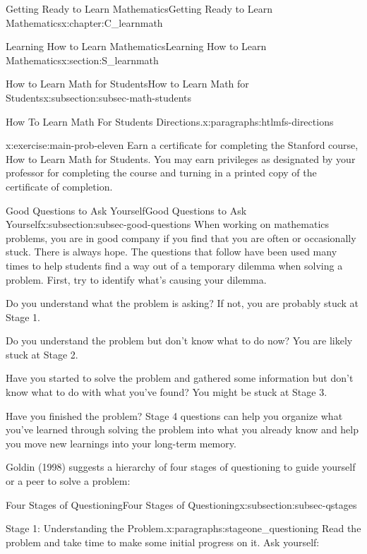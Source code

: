 \documentclass[oneside,10pt,]{book}
\numberwithin{equation}{chapter}
\begin{document}
\begin{chapterptx}{Getting Ready to Learn Mathematics}{}{Getting Ready to Learn Mathematics}{}{}{x:chapter:C_learnmath}
\begin{sectionptx}{Learning How to Learn Mathematics}{}{Learning How to Learn Mathematics}{}{}{x:section:S_learnmath}
\begin{subsectionptx}{How to Learn Math for Students}{}{How to Learn Math for Students}{}{}{x:subsection:subsec-math-students}
\begin{paragraphs}{How To Learn Math For Students Directions.}{x:paragraphs:htlmfs-directions}
\begin{inlineexercise}{}{x:exercise:main-prob-eleven}
Earn a certificate for completing the Stanford course, How to Learn Math for Students. You may earn privileges as designated by your professor for completing the course and turning in a printed copy of the certificate of completion.%
\end{inlineexercise}%
\end{paragraphs}%
\end{subsectionptx}
%
%
\typeout{************************************************}
\typeout{************************************************}
%
\begin{subsectionptx}{Good Questions to Ask Yourself}{}{Good Questions to Ask Yourself}{}{}{x:subsection:subsec-good-questions}
When working on mathematics problems, you are in good company if you find that you are often or occasionally stuck. There is always hope. The questions that follow have been used many times to help students find a way out of a temporary dilemma when solving a problem. First, try to identify what's causing your dilemma.%
\par
Do you understand what the problem is asking? If not, you are probably stuck at Stage 1.%
\par
Do you understand the problem but don't know what to do now? You are likely stuck at Stage 2.%
\par
Have you started to solve the problem and gathered some information but don't know what to do with what you've found? You might be stuck at Stage 3.%
\par
Have you finished the problem? Stage 4 questions can help you organize what you've learned through solving the problem into what you already know and help you move new learnings into your long-term memory.%
\par
Goldin (1998) suggests a hierarchy of four stages of questioning to guide yourself or a peer to solve a problem:%
\end{subsectionptx}
%
%
\typeout{************************************************}
\typeout{************************************************}
%
\begin{subsectionptx}{Four Stages of Questioning}{}{Four Stages of Questioning}{}{}{x:subsection:subsec-qstages}
\begin{paragraphs}{Stage 1: Understanding the Problem.}{x:paragraphs:stageone_questioning}%
Read the problem and take time to make some initial progress on it. Ask yourself:%
\par

\end{paragraphs}
\end{subsectionptx}
\end{sectionptx}
\end{chapterptx}
\end{document}
